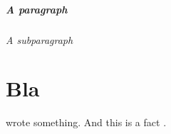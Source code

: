 \documentclass[pdftex,a4paper,twoside,bigchapter,bibtotoc,11pt]{scrbook}
\begin{document}
\paragraph{A paragraph}

\lipsum[2]

\subparagraph{A subparagraph}

\lipsum[3]

\chapter{Bla}
%
\citet{Aho:72} wrote something. 
%
And this is a fact \citep{Chandra:81}.

\backmatter


\nocite{*} %

\printbibliography

\appendix
\end{document}
